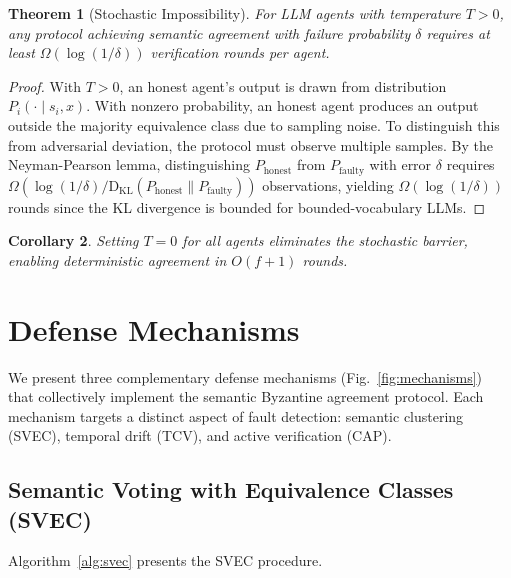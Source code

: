 \documentclass[journal,10pt]{IEEEtran}
\newtheorem{theorem}{Theorem}
\newtheorem{corollary}[theorem]{Corollary}
\newcommand{\KL}{\mathrm{D_{KL}}}
\begin{document}
\begin{theorem}[Stochastic Impossibility]\label{thm:impossibility}
For LLM agents with temperature $T > 0$, any protocol achieving semantic agreement with failure probability $\delta$ requires at least $\Omega(\log(1/\delta))$ verification rounds per agent.
\end{theorem}

\begin{proof}
With $T > 0$, an honest agent's output is drawn from distribution $P_i(\cdot \mid s_i, x)$. With nonzero probability, an honest agent produces an output outside the majority equivalence class due to sampling noise. To distinguish this from adversarial deviation, the protocol must observe multiple samples. By the Neyman-Pearson lemma, distinguishing $P_{\text{honest}}$ from $P_{\text{faulty}}$ with error $\delta$ requires $\Omega(\log(1/\delta) / \KL(P_{\text{honest}} \| P_{\text{faulty}}))$ observations, yielding $\Omega(\log(1/\delta))$ rounds since the KL divergence is bounded for bounded-vocabulary LLMs.
\end{proof}

\begin{corollary}\label{cor:temp}
Setting $T = 0$ for all agents eliminates the stochastic barrier, enabling deterministic agreement in $O(f+1)$ rounds.
\end{corollary}

\section{Defense Mechanisms}\label{sec:mechanisms}
We present three complementary defense mechanisms (Fig.~\ref{fig:mechanisms}) that collectively implement the semantic Byzantine agreement protocol. Each mechanism targets a distinct aspect of fault detection: semantic clustering (SVEC), temporal drift (TCV), and active verification (CAP).

\subsection{Semantic Voting with Equivalence Classes (SVEC)}
Algorithm~\ref{alg:svec} presents the SVEC procedure.
\end{document}
